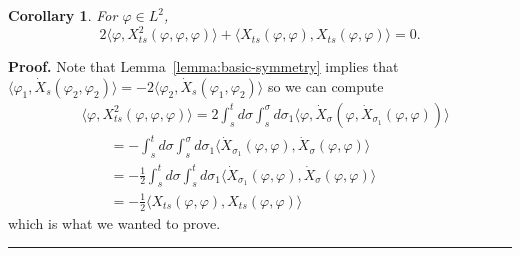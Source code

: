 \documentclass[a4paper,12pt,reqno]{article}
\newtheorem{corollary}[theorem]{Corollary}
\newenvironment{proof}[1][Proof]{\textbf{#1.} }{\ \rule{0.5em}{0.5em}}
\begin{document}
\begin{corollary} For $\varphi \in L^2$,
\label{cor:more-symmetry}
$$
2 \langle \varphi, X^2_{ts}(\varphi,\varphi,\varphi)\rangle
+   \langle X_{ts}(\varphi,\varphi), X_{ts}(\varphi,\varphi)\rangle = 0.
$$  
\end{corollary}
\begin{proof}
Note that Lemma~\ref{lemma:basic-symmetry} implies that
$
\langle \varphi_1 , \dot X_s(\varphi_2,\varphi_2) \rangle  =
-2 \langle \varphi_2 , \dot X_s(\varphi_1,\varphi_2) \rangle 
$
so  we can compute
  \begin{equation}
    \label{eq:cons-law-3}
    \begin{split}
  & \langle \varphi, X^2_{ts}(\varphi,\varphi,\varphi)\rangle = 
2 \int_s^t d\sigma \int_s^\sigma  d\sigma_1  
  \langle \varphi, \dot X_\sigma(\varphi,\dot
  X_{\sigma_1}(\varphi,\varphi))\rangle 
\\ & \qquad 
=- 
\int_s^t d\sigma \int_s^\sigma  d\sigma_1  
  \langle \dot
  X_{\sigma_1}(\varphi,\varphi), \dot X_\sigma(\varphi,\varphi)\rangle        
\\ & \qquad 
=- \frac12
\int_s^t d\sigma \int_s^t  d\sigma_1  
  \langle \dot
  X_{\sigma_1}(\varphi,\varphi), \dot X_\sigma(\varphi,\varphi)\rangle        
\\ & \qquad 
=- \frac12
  \langle 
  X_{ts}(\varphi,\varphi),  X_{ts}(\varphi,\varphi)\rangle        
    \end{split}
  \end{equation}
which is what we wanted to prove.
\end{proof}
\end{document}
